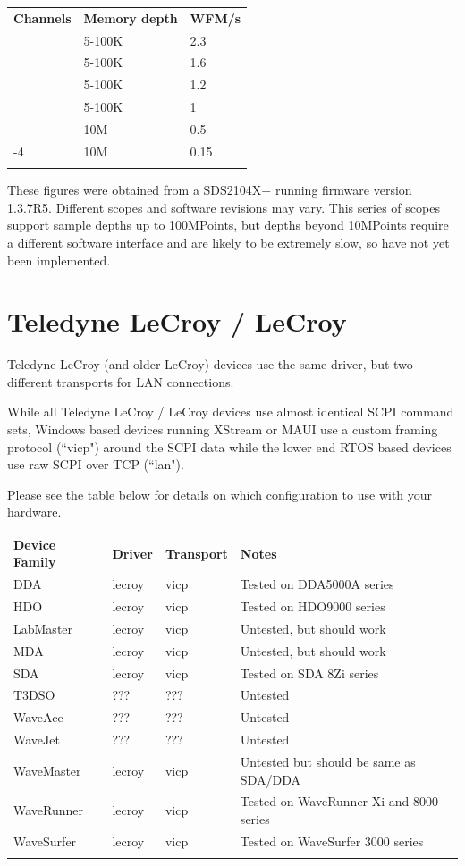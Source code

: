 \begin{tabularx}{16cm}{llX}
\thickhline
\textbf{Channels} & \textbf{Memory depth} & \textbf{WFM/s}\\
\thickhline
1 & 5-100K & 2.3 \\
\thinhline
2 & 5-100K & 1.6 \\
\thinhline
3 & 5-100K & 1.2 \\
\thinhline
4 & 5-100K & 1 \\
\thinhline
1 & 10M & 0.5 \\
\thinhline
2-4 & 10M & 0.15 \\
\thickhline
\end{tabularx}

These figures were obtained from a SDS2104X+ running firmware version 1.3.7R5. Different scopes and software
revisions may vary. This series of scopes support sample depths up to 100MPoints, but depths beyond 10MPoints
require a different software interface and are likely to be extremely slow, so have not yet been implemented.

\section{Teledyne LeCroy / LeCroy}

Teledyne LeCroy (and older LeCroy) devices use the same driver, but two different transports for LAN connections.

While all Teledyne LeCroy / LeCroy devices use almost identical SCPI command sets, Windows based devices running
XStream or MAUI use a custom framing protocol (``vicp") around the SCPI data while the lower end RTOS based devices use
raw SCPI over TCP (``lan").

Please see the table below for details on which configuration to use with  your hardware.

\begin{tabularx}{16cm}{lllX}
\thickhline
\textbf{Device Family} & \textbf{Driver} & \textbf{Transport} & \textbf{Notes} \\
\thickhline
DDA & lecroy & vicp & Tested on DDA5000A series \\
\thickhline
HDO & lecroy & vicp & Tested on HDO9000 series \\
\thickhline
LabMaster & lecroy & vicp & Untested, but should work\\
\thickhline
MDA & lecroy & vicp & Untested, but should work\\
\thickhline
SDA & lecroy & vicp & Tested on SDA 8Zi series\\
\thickhline
T3DSO & ??? & ??? & Untested\\
\thickhline
WaveAce & ??? & ??? & Untested\\
\thickhline
WaveJet & ??? & ??? & Untested\\
\thickhline
WaveMaster & lecroy & vicp & Untested but should be same as SDA/DDA\\
\thickhline
WaveRunner & lecroy & vicp & Tested on WaveRunner Xi and 8000 series\\
\thickhline
WaveSurfer & lecroy & vicp & Tested on WaveSurfer 3000 series \\
\thickhline
\end{tabularx}

